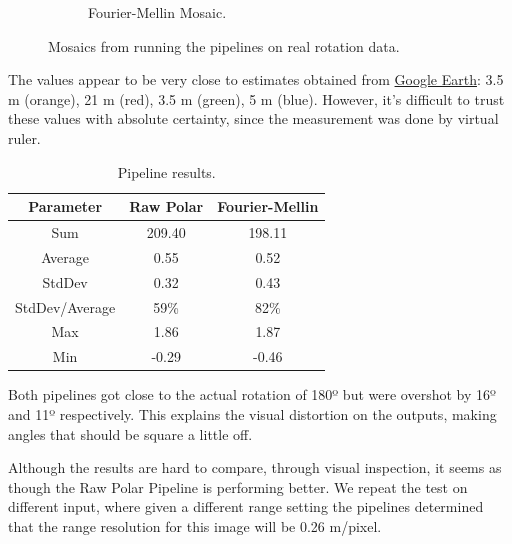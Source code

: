 \begin{figure}[H]
\begin{subfigure}[b]{0.47\textwidth}
        \caption{Fourier-Mellin Mosaic.}
    \end{subfigure}
    \label{fig:sonar-mosaic}
    \caption{Mosaics from running the pipelines on real rotation data.}
\end{figure}

The values appear to be very close to estimates obtained from \href{https://earth.google.com/web/@63.44158505,10.41727398,0.31239001a,140.28884032d,35y,151.00013963h,0t,0r/data=OgMKATA}{Google Earth}: 3.5 m (orange), 21 m (red), 3.5 m (green), 5 m (blue). However, it's difficult to trust these values with absolute certainty, since the measurement was done by virtual ruler.

\begin{table}[H]
    \centering
    \begin{tabular}{|c|c|c|}
        \hline
        \textbf{Parameter} & \textbf{Raw Polar} & \textbf{Fourier-Mellin} \\ \hline
        Sum & 209.40 & 198.11 \\ \hline
        Average & 0.55 & 0.52 \\ \hline
        StdDev & 0.32 & 0.43 \\ \hline
        StdDev/Average & 59\% & 82\% \\ \hline
        Max & 1.86 & 1.87 \\ \hline
        Min & -0.29 & -0.46 \\ \hline    
        \end{tabular}
    \caption{Pipeline results.}
\end{table}

Both pipelines got close to the actual rotation of 180º but were overshot by 16º and 11º respectively. This explains the visual distortion on the outputs, making angles that should be square a little off.   

Although the results are hard to compare, through visual inspection, it seems as though the Raw Polar Pipeline is performing better. We repeat the test on different input, where given a different range setting the pipelines determined that the range resolution for this image will be 0.26 m/pixel.


